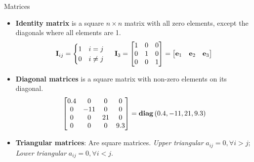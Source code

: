 \documentclass[aspectratio=169]{beamer}
\def\mf{\ensuremath\mathbf}
\begin{document}
\begin{frame}[t]{Matrices}
\begin{itemize}
\item \textbf{Identity matrix} is a square $n \times n$ matrix with all zero elements, except the diagonals where all elements are 1.
$$\mf{I}_{ij} = \begin{cases}
1 & i = j\\
0 & i \neq j
\end{cases} \,\,\,\,\,\,\,\, \mf{I}_3=\begin{bmatrix}
1 & 0 & 0\\
0 & 1 & 0\\
0 & 0 & 1\\
\end{bmatrix} = \begin{bmatrix}
\mf{e}_1 & \mf{e}_2 & \mf{e}_3
\end{bmatrix}$$
\item \textbf{Diagonal matrices} is a square matrix with non-zero elements on its diagonal.
$$\begin{bmatrix}
0.4 & 0 & 0 & 0\\
0 & -11 & 0 & 0\\
0 & 0 & 21 & 0\\
0 & 0 & 0 & 9.3\\
\end{bmatrix} = \text{\textbf{diag}}\left(0.4, -11, 21, 9.3\right)$$
\item \textbf{Triangular matrices}: Are square matrices. \textit{Upper triangular} $a_{ij} = 0, \forall i > j$; \textit{Lower triangular} $a_{ij} = 0, \forall i < j$.
\end{itemize}
\end{frame}
\end{document}
